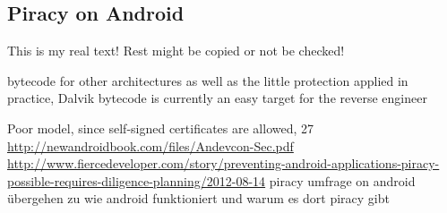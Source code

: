 \subsection{Piracy on Android }\label{subsection:foundation-piracy-android}
This is my real text! Rest might be copied or not be checked!

%
bytecode for other architectures as well as the little protection
applied in practice, Dalvik bytecode is currently an easy target for the reverse engineer
%

Poor model, since self-signed certificates are allowed, 27 \url{http://newandroidbook.com/files/Andevcon-Sec.pdf}\newline
\url{http://www.fiercedeveloper.com/story/preventing-android-applications-piracy-possible-requires-diligence-planning/2012-08-14} piracy umfrage on android\newline
übergehen zu wie android funktioniert und warum es dort piracy gibt\newline
